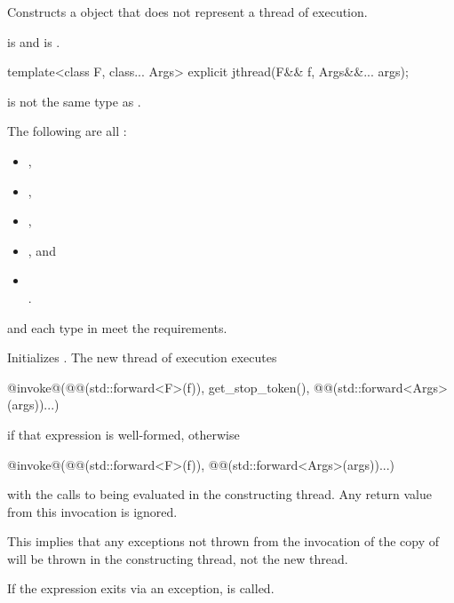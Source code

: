 \begin{itemdescr}
\pnum
\effects
Constructs a  object that does not represent
a thread of execution.

\pnum
\ensures
{} is 
and  is .
\end{itemdescr}

%
\begin{itemdecl}
template<class F, class... Args> explicit jthread(F&& f, Args&&... args);
\end{itemdecl}

\begin{itemdescr}
\pnum
\constraints
{} is not the same type as .

\pnum
\mandates
The following are all :
\begin{itemize}
\item {},
\item {},
\item {},
\item {}, and
\item {} \\ .
\end{itemize}

\pnum
\expects
{} and each type in  meet the
 requirements.

\pnum
\effects
Initializes .
The new thread of execution executes
\begin{codeblock}
@invoke@(@@(std::forward<F>(f)), get_stop_token(),
       @@(std::forward<Args>(args))...)
\end{codeblock}
if that expression is well-formed,
otherwise
\begin{codeblock}
@invoke@(@@(std::forward<F>(f)), @@(std::forward<Args>(args))...)
\end{codeblock}
with the calls to
 being evaluated in the constructing thread.
Any return value from this invocation is ignored.
\begin{note}
This implies that any exceptions not thrown from the invocation of the copy
of  will be thrown in the constructing thread, not the new thread.
\end{note}
If the  expression exits via an exception,
 is called.


\end{itemdescr}
